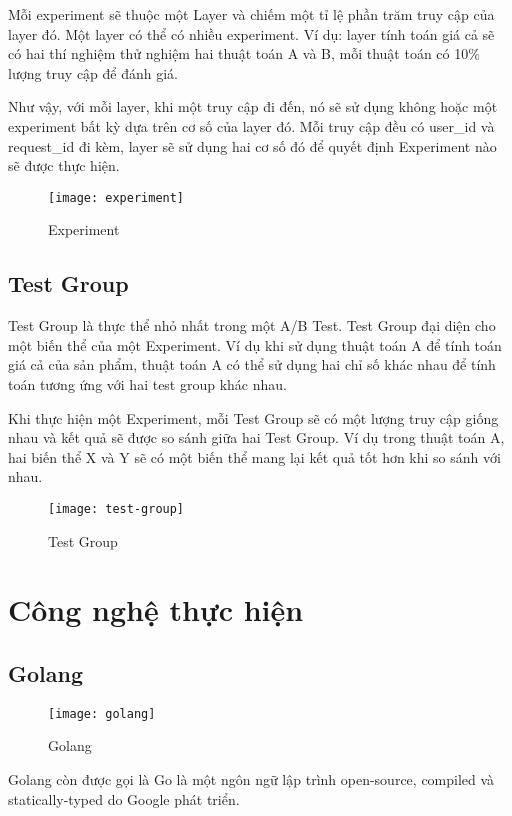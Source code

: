 Mỗi experiment sẽ thuộc một Layer và chiếm một tỉ lệ phần trăm truy cập của layer đó. Một layer có thể có nhiều experiment. Ví dụ: layer tính toán giá cả sẽ có hai thí nghiệm thử nghiệm hai thuật toán A và B, mỗi thuật toán có 10\% lượng truy cập để đánh giá.

Như vậy, với mỗi layer, khi một truy cập đi đến, nó sẽ sử dụng không hoặc một experiment bất kỳ dựa trên cơ số của layer đó. Mỗi truy cập đều có user\_id và request\_id đi kèm, layer sẽ sử dụng hai cơ số đó để quyết định Experiment nào sẽ được thực hiện.

\begin{figure}[H]
	\centering
	\texttt{[image: experiment]}
	\caption{Experiment}
\end{figure}

\subsection{Test Group}

Test Group là thực thể nhỏ nhất trong một A/B Test. Test Group đại diện cho một biến thể của một Experiment. Ví dụ khi sử dụng thuật toán A để tính toán giá cả của sản phẩm, thuật toán A có thể sử dụng hai chỉ số khác nhau để tính toán tương ứng với hai test group khác nhau.

Khi thực hiện một Experiment, mỗi Test Group sẽ có một lượng truy cập giống nhau và kết quả sẽ được so sánh giữa hai Test Group. Ví dụ trong thuật toán A, hai biến thể X và Y sẽ có một biến thể mang lại kết quả tốt hơn khi so sánh với nhau.

\begin{figure}[H]
	\centering
	\texttt{[image: test-group]}
	\caption{Test Group}
\end{figure}

\section{Công nghệ thực hiện}

\subsection{Golang}

\begin{figure}[H]
	\centering
	\texttt{[image: golang]}
	\caption{Golang}
\end{figure}

Golang còn được gọi là Go là một ngôn ngữ lập trình open-source, compiled và statically-typed do Google phát triển.

